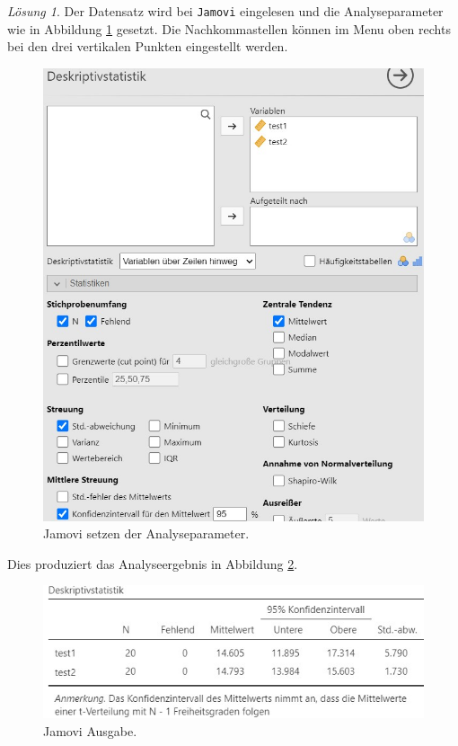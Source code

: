 \documentclass[
]{book}
\theoremstyle{definition}
\theoremstyle{definition}
\theoremstyle{definition}
\theoremstyle{definition}
\theoremstyle{remark}
\newtheorem*{solution}{Lösung}
\begin{document}
\begin{solution}
Der Datensatz wird bei \texttt{Jamovi} eingelesen und die Analyseparameter wie in Abbildung \ref{fig:sol-biologietest-input} gesetzt. Die Nachkommastellen können im Menu oben rechts bei den drei vertikalen Punkten eingestellt werden.

\begin{figure}
\includegraphics[width=1\linewidth]{figures/04-exr-biologietest-jmv-input} \caption{Jamovi setzen der Analyseparameter.}\label{fig:sol-biologietest-input}
\end{figure}

Dies produziert das Analyseergebnis in Abbildung \ref{fig:sol-biologietest-output}.

\begin{figure}
\includegraphics[width=1\linewidth]{figures/04-exr-biologietest-jmv-output} \caption{Jamovi Ausgabe.}\label{fig:sol-biologietest-output}
\end{figure}


\end{solution}
\end{document}
